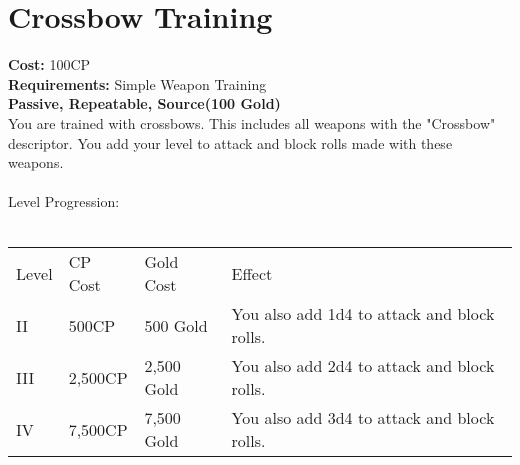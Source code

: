 \section{Crossbow Training}\label{perk:crossbowTraining}
\textbf{Cost:} 100CP\\
\textbf{Requirements:} Simple Weapon Training\\
\textbf{Passive, Repeatable, Source(100 Gold)}\\
You are trained with crossbows.
This includes all weapons with the "Crossbow" descriptor.
You add your level to attack and block rolls made with these weapons.\\
\\
Level Progression:\\
\\
\begin{tabular}{l | l | l | l}
	Level & CP Cost & Gold Cost & Effect\\
	II & 500CP & 500 Gold & You also add 1d4 to attack and block rolls.\\
	III & 2,500CP & 2,500 Gold & You also add 2d4 to attack and block rolls.\\
	IV & 7,500CP & 7,500 Gold & You also add 3d4 to attack and block rolls.\\
\end{tabular}